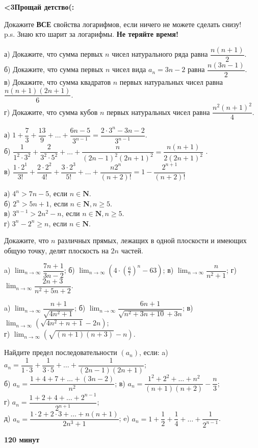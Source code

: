 \centerline{\bf \Huge <3Прощай детство(:}

 Докажите \textbf{ВСЕ} свойства логарифмов, если ничего не можете сделать снизу!\\
p.s. Знаю кто шарит за логарифмы. 
\textbf{Не теряйте время!}

 а) Докажите, что сумма первых $n$ чисел натурального ряда равна $\dfrac{n(n+1)}{2}$.\\
б) Докажите, что сумма первых $n$ чисел вида $a_n=3 n-2$ равна $\dfrac{n(3 n-1)}{2}$.\\
в) Докажите, что сумма квадратов $n$ первых натуральных чисел равна $\dfrac{n(n+1)(2 n+1)}{6}$.\\
г) Докажите, что сумма кубов $n$ первых натуральных чисел равна $\dfrac{n^2(n+1)^2}{4}$.

 а) $ 1+\dfrac{7}{3}+\dfrac{13}{9}+\ldots+\dfrac{6 n-5}{3^{n-1}}=\dfrac{2 \cdot 3^n-3 n-2}{3^{n-1}} .$ \\ 
б) $\dfrac{1}{1^2 \cdot 3^2}+\dfrac{2}{3^2 \cdot 5^2}+\ldots+\dfrac{n}{(2 n-1)^2(2 n+1)^2}=\dfrac{n(n+1)}{2(2 n+1)^2}$ . \\ 
в) $\dfrac{1 \cdot 2^1}{3!}+\dfrac{2 \cdot 2^2}{4!}+\dfrac{3 \cdot 2^3}{5!}+\ldots+\dfrac{n 2^n}{(n+2)!}=1-\dfrac{2^{n+1}}{(n+2)!}$

а) $4^n>7 n-5$, если $n \in \boldsymbol{N}$.\\
б) $2^n>5 n+1$, если $n \in \boldsymbol{N}, n \geqslant 5$.\\
в) $3^{n-1}>2 n^2-n$, если $n \in \boldsymbol{N}, n \geqslant 5$.\\
г) $3^n-2^n \geqslant n$, если $n \in \boldsymbol{N}$.

 Докажите, что $n$ различных прямых, лежащих в одной плоскости и имеющих общую точку, делят плоскость на $2 n$ частей.


 a) $\lim _{n \rightarrow \infty} \dfrac{7 n+1}{3 n-2}$;
б) $\lim _{n \rightarrow \infty}\left(4 \cdot\left(\frac{6}{7}\right)^n-63\right)$;
в) $\lim _{n \rightarrow \infty} \dfrac{n}{n^2+1}$;
г) $\lim _{n \rightarrow \infty} \dfrac{2 n+3}{n^2+5 n+2}$.

 a) $\lim _{n \rightarrow \infty} \dfrac{n+1}{\sqrt{4 n^2+1}}$;
б) $\lim _{n \rightarrow \infty} \dfrac{6 n+1}{\sqrt{n^2+3 n+10}+3 n}$;
в) $\lim _{n \rightarrow \infty}\left(\sqrt{4 n^2+n+1}-2 n\right)$;\\
г) $\lim _{n \rightarrow \infty}(\sqrt{(n+1)(n+3)}-n)$.

 Найдите предел последовательности $\left(a_n\right)$, если:
a) $a_n=\dfrac{1}{1 \cdot 3}+\dfrac{1}{3 \cdot 5}+\ldots+\dfrac{1}{(2 n-1)(2 n+1)}$;\\
б) $a_n=\dfrac{1+4+7+\ldots+(3 n-2)}{n^2}$;
в) $a_n=\dfrac{1^2+2^2+\ldots+n^2}{(n+1)(n+2)}-\dfrac{n}{3}$;\\
г) $a_n=\dfrac{1+2+4+\ldots+2^{n-1}}{2^{n+1}}$;\\
д) $a_n=\dfrac{1 \cdot 2+2 \cdot 3+\ldots+n(n+1)}{2 n^3+1}$;
e) $a_n=1+\dfrac{1}{2}+\dfrac{1}{4}+\ldots+\dfrac{1}{2^{n-1}}$.

\centerline{\textbf{120 минут}}